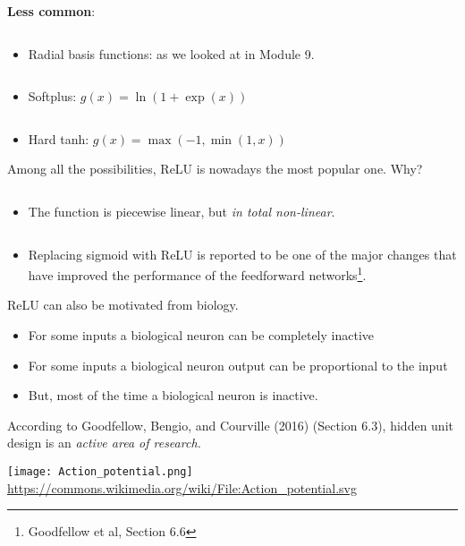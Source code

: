 \documentclass[
  10pt,
  ignorenonframetext,
]{beamer}
\providecommand{\tightlist}{%
  \setlength{\itemsep}{0pt}\setlength{\parskip}{0pt}}
\begin{document}
\begin{frame}
\textbf{Less common}:

\(~\)

\begin{itemize}
\tightlist
\item
  Radial basis functions: as we looked at in Module 9.
\end{itemize}

\(~\)

\begin{itemize}
\tightlist
\item
  Softplus: \(g(x)=\ln(1+\exp(x))\)
\end{itemize}

\(~\)

\begin{itemize}
\tightlist
\item
  Hard tanh: \(g(x)=\max(-1,\min(1,x))\)
\end{itemize}
\end{frame}

\begin{frame}
Among all the possibilities, ReLU is nowadays the most popular one. Why?

\(~\)

\begin{itemize}
\tightlist
\item
  The function is piecewise linear, but \emph{in total non-linear}.
\end{itemize}

\(~\)

\begin{itemize}
\tightlist
\item
  Replacing sigmoid with ReLU is reported to be one of the major changes
  that have improved the performance of the feedforward
  networks\footnote{Goodfellow et al, Section 6.6}.
\end{itemize}
\end{frame}

\begin{frame}
ReLU can also be motivated from biology.

\begin{itemize}
\tightlist
\item
  For some inputs a biological neuron can be completely inactive
\item
  For some inputs a biological neuron output can be proportional to the
  input
\item
  But, most of the time a biological neuron is inactive.
\end{itemize}

According to Goodfellow, Bengio, and Courville (2016) (Section 6.3),
hidden unit design is an \emph{active area of research.}

\centering
\texttt{[image: Action\_potential.png]}
\small
\url{https://commons.wikimedia.org/wiki/File:Action_potential.svg}
\end{frame}
\end{document}
